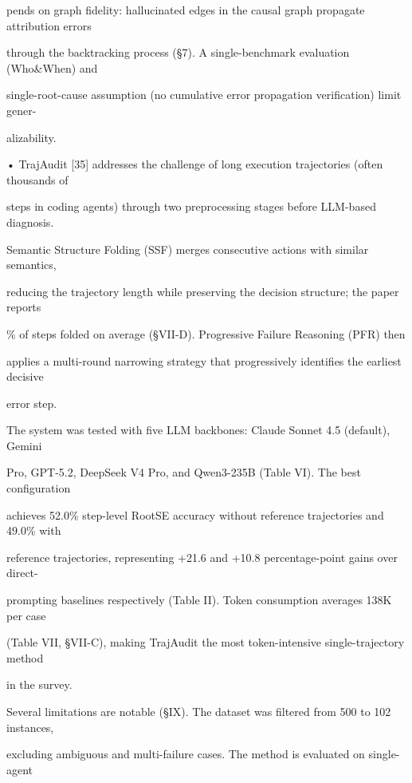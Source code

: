 \begin{flushleft}
\noindent  pends on graph fidelity: hallucinated edges in the causal graph propagate attribution errors\par
\noindent  through the backtracking process (§7). A single-benchmark evaluation (Who\&When) and\par
\noindent  single-root-cause assumption (no cumulative error propagation verification) limit gener-\par
\noindent  alizability.\par
\noindent  • TrajAudit [35] addresses the challenge of long execution trajectories (often thousands of\par
\noindent  steps in coding agents) through two preprocessing stages before LLM-based diagnosis.\par
\noindent  Semantic Structure Folding (SSF) merges consecutive actions with similar semantics,\par
\noindent  reducing the trajectory length while preserving the decision structure; the paper reports\par
{}\% of steps folded on average (§VII-D). Progressive Failure Reasoning (PFR) then\par
\noindent  applies a multi-round narrowing strategy that progressively identifies the earliest decisive\par
\noindent  error step.\par
\noindent  The system was tested with five LLM backbones: Claude Sonnet 4.5 (default), Gemini\par
{} Pro, GPT-5.2, DeepSeek V4 Pro, and Qwen3-235B (Table VI). The best configuration\par
\noindent  achieves 52.0\% step-level RootSE accuracy without reference trajectories and 49.0\% with\par
\noindent  reference trajectories, representing +21.6 and +10.8 percentage-point gains over direct-\par
\noindent  prompting baselines respectively (Table II). Token consumption averages 138K per case\par
\noindent  (Table VII, §VII-C), making TrajAudit the most token-intensive single-trajectory method\par
\noindent  in the survey.\par
\noindent  Several limitations are notable (§IX). The dataset was filtered from 500 to 102 instances,\par
\noindent  excluding ambiguous and multi-failure cases. The method is evaluated on single-agent\par

\end{flushleft}
